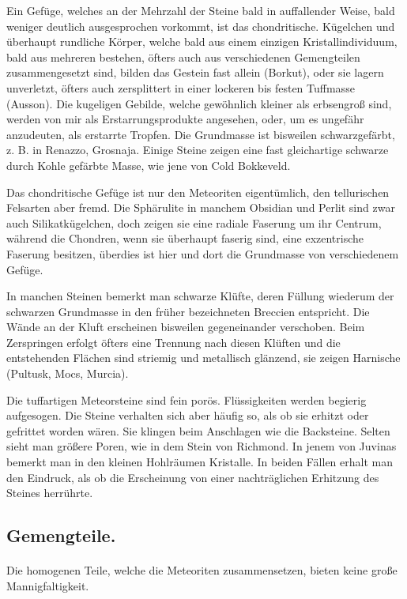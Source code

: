 \documentclass[a4paper, 11pt, oneside, polutonikogreek, german]{article}
\begin{document}
Ein Gefüge, welches an der Mehrzahl der Steine bald in auffallender Weise, bald weniger deutlich ausgesprochen vorkommt, ist das chondritische. Kügelchen und überhaupt rundliche Körper, welche bald aus einem einzigen Kristallindividuum, bald aus mehreren bestehen, öfters auch aus verschiedenen Gemengteilen zusammengesetzt sind, bilden das Gestein fast allein (Borkut), oder sie lagern unverletzt, öfters auch zersplittert in einer lockeren bis festen Tuffmasse (Ausson). Die kugeligen Gebilde, welche gewöhnlich kleiner als erbsengroß sind, werden von mir als Erstarrungsprodukte angesehen, oder, um es ungefähr anzudeuten, als erstarrte Tropfen. Die Grundmasse ist bisweilen schwarzgefärbt, z. B. in Renazzo, Grosnaja. Einige Steine zeigen eine fast gleichartige schwarze durch Kohle gefärbte Masse, wie jene von Cold Bokkeveld.

Das chondritische Gefüge ist nur den Meteoriten eigentümlich, den tellurischen Felsarten aber fremd. Die Sphärulite in manchem Obsidian und Perlit sind zwar auch Silikatkügelchen, doch zeigen sie eine radiale Faserung um ihr Centrum, während die Chondren, wenn sie überhaupt faserig sind, eine exzentrische Faserung besitzen, überdies ist hier und dort die Grundmasse von verschiedenem Gefüge.

In manchen Steinen bemerkt man schwarze Klüfte, deren Füllung wiederum der schwarzen Grundmasse in den früher bezeichneten Breccien entspricht. Die Wände an der Kluft erscheinen bisweilen gegeneinander verschoben. Beim Zerspringen erfolgt öfters eine Trennung nach diesen Klüften und die entstehenden Flächen sind striemig und metallisch glänzend, sie zeigen Harnische (Pultusk, Mocs, Murcia).

Die tuffartigen Meteorsteine sind fein porös. Flüssigkeiten werden begierig aufgesogen. Die Steine verhalten sich aber häufig so, als ob sie erhitzt oder gefrittet worden wären. Sie klingen beim Anschlagen wie die Backsteine. Selten sieht man größere Poren, wie in dem Stein von Richmond. In jenem von Juvinas bemerkt man in den kleinen Hohlräumen Kristalle. In beiden Fällen erhalt man den Eindruck, als ob die Erscheinung von einer nachträglichen Erhitzung des Steines herrührte.

\subsection{Gemengteile.}
\paragraph*{}
Die homogenen Teile, welche die Meteoriten zusammensetzen, bieten keine große Mannigfaltigkeit.
\end{document}
